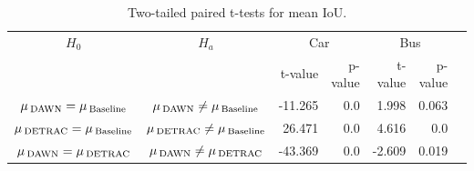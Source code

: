 \documentclass[]{article}
\begin{document}
	\begin{table}[H]
	\centering
	\begin{tabular}{ccrrrrp{1.5in}}
		\toprule
		\textbf{$H_0$} & \textbf{$H_a$} &  \multicolumn{2}{c}{Car} &  \multicolumn{2}{c}{Bus}  \\
		{}             & {}             & t-value  & p-value       & t-value & p-value \\
		\midrule
		$\mu\,\textsubscript{DAWN} = \mu\,\textsubscript{Baseline}$   & $\mu\,\textsubscript{DAWN} \neq \mu\,\textsubscript{Baseline}$   & -11.265 & 0.0 & 1.998 & 0.063  \\
		$\mu\,\textsubscript{DETRAC} = \mu\,\textsubscript{Baseline}$ & $\mu\,\textsubscript{DETRAC} \neq \mu\,\textsubscript{Baseline}$ & 26.471 & 0.0 & 4.616 & 0.0 \\
		$\mu\,\textsubscript{DAWN} = \mu\,\textsubscript{DETRAC}$ & $\mu\,\textsubscript{DAWN} \neq \mu\,\textsubscript{DETRAC}$ & -43.369  & 0.0 & -2.609 & 0.019 \\
		\bottomrule
	\end{tabular}
	\caption{Two-tailed paired t-tests for mean IoU.}
	\label{table:iou-t-test}
	\end{table}	     
\end{document}
